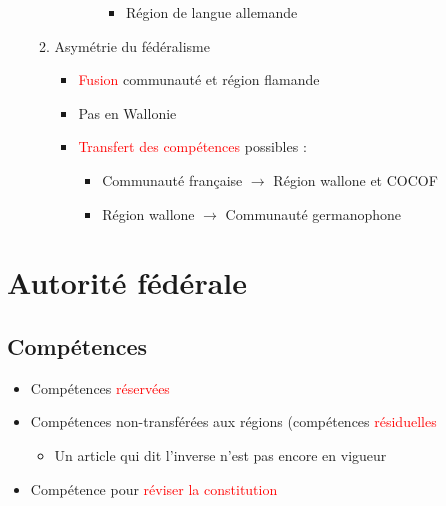 \begin{itemize}
\begin{enumerate}
\begin{itemize}
\begin{itemize}
				\begin{itemize}
					\item Région de langue allemande
				\end{itemize}
			\end{itemize}
		\end{itemize}
		\item Asymétrie du fédéralisme
		\begin{itemize}
			\item \textcolor{red}{Fusion} communauté et région flamande
			\item Pas en Wallonie
			\item \textcolor{red}{Transfert des compétences} possibles :
			\begin{itemize}
				\item Communauté française $\rightarrow$ Région wallone et COCOF
				\item Région wallone $\rightarrow$ Communauté germanophone
			\end{itemize}
		\end{itemize}
	\end{enumerate}
\end{itemize}

\section{Autorité fédérale}

\subsection{Compétences}
\begin{itemize}
	\item Compétences \textcolor{red}{réservées}
	\item Compétences non-transférées aux régions (compétences \textcolor{red}{résiduelles}
	\begin{itemize}
		\item Un article qui dit l'inverse n'est pas encore en vigueur
	\end{itemize}
	\item Compétence pour \textcolor{red}{réviser la constitution}
\end{itemize}

